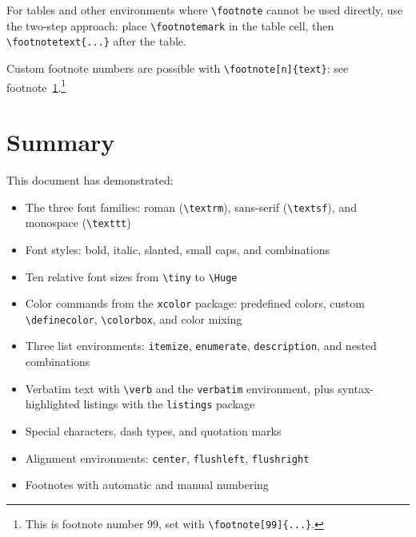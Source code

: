 \documentclass[12pt,a4paper]{article}
\begin{document}
For tables and other environments where \verb|\footnote| cannot be used
directly, use the two-step approach: place \verb|\footnotemark| in the table
cell, then \verb|\footnotetext{...}| after the table.\footnotemark


Custom footnote numbers are possible with \verb|\footnote[n]{text}|: see
footnote~\ref{fn:custom}.\footnote[99]{This is footnote number 99, set
with \texttt{\textbackslash footnote[99]\{...\}}.\label{fn:custom}}


\section*{Summary}

This document has demonstrated:
\begin{itemize}
    \item The three font families: roman (\verb|\textrm|), sans-serif (\verb|\textsf|),
          and monospace (\verb|\texttt|)
    \item Font styles: bold, italic, slanted, small caps, and combinations
    \item Ten relative font sizes from \verb|\tiny| to \verb|\Huge|
    \item Color commands from the \texttt{xcolor} package: predefined colors,
          custom \verb|\definecolor|, \verb|\colorbox|, and color mixing
    \item Three list environments: \texttt{itemize}, \texttt{enumerate},
          \texttt{description}, and nested combinations
    \item Verbatim text with \verb|\verb| and the \texttt{verbatim} environment,
          plus syntax-highlighted listings with the \texttt{listings} package
    \item Special characters, dash types, and quotation marks
    \item Alignment environments: \texttt{center}, \texttt{flushleft},
          \texttt{flushright}
    \item Footnotes with automatic and manual numbering
\end{itemize}
\end{document}
